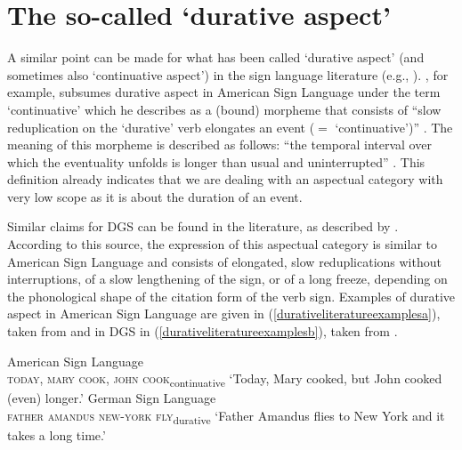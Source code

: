 \section{The so-called `durative aspect'}\label{durativecontinuative}
A similar point can be made for what has been called `durative aspect' (and sometimes also `continuative aspect') in the sign language literature (e.g., \citealt{rathmann2005event,brunelli2011antisymmetry}). \citet{rathmann2005event}, for example, subsumes durative aspect in American Sign Language under the term `continuative' which he describes as a (bound) morpheme that consists of ``slow reduplication on the `durative' verb elongates an event ($=$ `continuative')'' \citep[27]{rathmann2005event}. The meaning of this morpheme is described as follows: ``the temporal interval over which the eventuality unfolds is longer than usual and uninterrupted'' \citep[36]{rathmann2005event}. This definition already indicates that we are dealing with an aspectual category with very low scope as it is about the duration of an event.


Similar claims for DGS can be found in the literature, as described by \citet[145, 282]{happ2014vork}. According to this source, the expression of this aspectual category is similar to American Sign Language and consists of elongated, slow reduplications without interruptions, of a slow lengthening of the sign, or of a long freeze, depending on the phonological shape of the citation form of the verb sign. Examples of durative aspect in American Sign Language are given in (\ref{durativeliteratureexamplesa}), taken from \citet[35]{rathmann2005event} and in DGS in (\ref{durativeliteratureexamplesb}), taken from \citet[145]{happ2014vork}.

\begin{exe}
\ex  \label{ex:durativeliteratureexamples}\begin{xlist}
\ex American Sign Language \citep[35]{rathmann2005event} \\ {\textsc{today, mary cook, john cook}\textsubscript{continuative}}
\glt `Today, Mary cooked, but John cooked (even) longer.' \label{durativeliteratureexamplesa}
\ex German Sign Language \citep[146]{happ2014vork} \\ {\textsc{father amandus new-york fly}\textsubscript{durative}}
\glt `Father Amandus flies to New York and it takes a long time.' \label{durativeliteratureexamplesb}
\end{xlist}
\end{exe}

